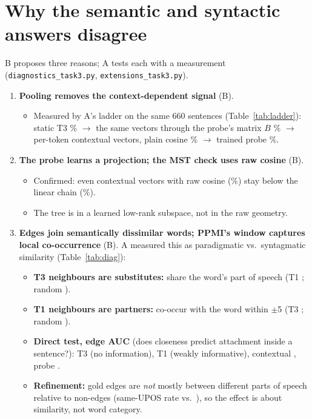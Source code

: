 \documentclass[11pt,a4paper]{article}
\begin{document}
\section{Why the semantic and syntactic answers disagree}\label{sec:why}
B proposes three reasons; A tests each with a measurement (\texttt{diagnostics\_task3.py}, \texttt{extensions\_task3.py}).
\begin{enumerate}
\item \textbf{Pooling removes the context-dependent signal} (B).
\begin{itemize}
\item Measured by A's ladder on the same 660 sentences (Table~\ref{tab:ladder}): static T3 \TThreePool\% $\to$ the same vectors through the
probe's matrix $B$ \LadProjPool\% $\to$ per-token contextual vectors, plain cosine \LadCtxPool\% $\to$ trained probe \TTwoRefPool\%.
\end{itemize}
\item \textbf{The probe learns a projection; the MST check uses raw cosine} (B).
\begin{itemize}
\item Confirmed: even contextual vectors with raw cosine (\LadCtxPool\%) stay below the linear chain (\ChainPool\%).
\item The tree is in a learned low-rank subspace, not in the raw geometry.
\end{itemize}
\item \textbf{Edges join semantically dissimilar words; PPMI's window captures local co-occurrence} (B). A measured this as paradigmatic
vs.\ syntagmatic similarity \citep{sahlgren} (Table~\ref{tab:diag}):
\begin{itemize}
\item \textbf{T3 neighbours are substitutes:} \NNSameTThree{} share the word's part of speech (T1 \NNSameTOne; random \NNSameRandom).
\item \textbf{T1 neighbours are partners:} \NNCoocTOne{} co-occur with the word within $\pm$5 (T3 \NNCoocTThree; random \NNCoocRandom).
\item \textbf{Direct test, edge AUC} (does closeness predict attachment inside a sentence?): T3 \AucTThree{} (no information), T1 \AucTOne{}
(weakly informative), contextual \AucCtx, probe \AucProbe.
\item \textbf{Refinement:} gold edges are \emph{not} mostly between different parts of speech relative to non-edges (same-UPOS rate
\GoldSameUpos{} vs.\ \GoldSameUposNon), so the effect is about similarity, not word category.
\end{itemize}
\end{enumerate}
\end{document}
